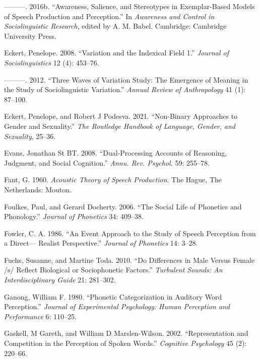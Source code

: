 \documentclass[
  letterpaper,
  DIV=11,
  numbers=noendperiod]{scrartcl}
\newlength{\cslhangindent}
\newenvironment{CSLReferences}[2] %
 {\begin{list}{}{%
  \setlength{\itemindent}{0pt}
  \setlength{\leftmargin}{0pt}
  \setlength{\parsep}{0pt}
  \ifodd #1
   \setlength{\leftmargin}{\cslhangindent}
   \setlength{\itemindent}{-1\cslhangindent}
  \fi
  \setlength{\itemsep}{#2\baselineskip}}}
 {\end{list}}
\begin{document}
\begin{CSLReferences}{1}{0}
---------. 2016b. {``Awareness, Salience, and Stereotypes in
Exemplar-Based Models of Speech Production and Perception.''} In
\emph{Awareness and Control in Sociolinguistic Research}, edited by A.
M. Babel. Cambridge: Cambridge University Press.

Eckert, Penelope. 2008. {``Variation and the Indexical Field 1.''}
\emph{Journal of Sociolinguistics} 12 (4): 453--76.

---------. 2012. {``Three Waves of Variation Study: {The} Emergence of
Meaning in the Study of Sociolinguistic Variation.''} \emph{Annual
Review of Anthropology} 41 (1): 87--100.

Eckert, Penelope, and Robert J Podesva. 2021. {``Non-Binary Approaches
to Gender and Sexuality.''} \emph{The Routledge Handbook of Language,
Gender, and Sexuality}, 25--36.

Evans, Jonathan St BT. 2008. {``Dual-Processing Accounts of Reasoning,
Judgment, and Social Cognition.''} \emph{Annu. Rev. Psychol.} 59:
255--78.

Fant, G. 1960. \emph{Acoustic Theory of Speech Production}. The Hague,
The Netherlands: Mouton.

Foulkes, Paul, and Gerard Docherty. 2006. {``The Social Life of
Phonetics and Phonology.''} \emph{Journal of Phonetics} 34: 409--38.

Fowler, C. A. 1986. {``An Event Approach to the Study of Speech
Perception from a Direct--- Realist Perspective.''} \emph{Journal of
Phonetics} 14: 3--28.

Fuchs, Susanne, and Martine Toda. 2010. {``Do Differences in Male Versus
Female /s/ Reflect Biological or Sociophonetic Factors.''}
\emph{Turbulent Sounds: An Interdisciplinary Guide} 21: 281--302.

Ganong, William F. 1980. {``Phonetic Categorization in Auditory Word
Perception.''} \emph{Journal of Experimental Psychology: Human
Perception and Performance} 6: 110--25.

Gaskell, M Gareth, and William D Marslen-Wilson. 2002. {``Representation
and Competition in the Perception of Spoken Words.''} \emph{Cognitive
Psychology} 45 (2): 220--66.


\end{CSLReferences}
\end{document}
